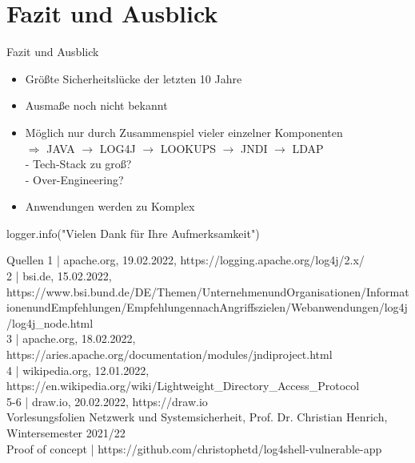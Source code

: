 \documentclass{beamer}
\begin{document}
\section{Fazit und Ausblick}
\begin{frame}{Fazit und Ausblick}
 \begin{itemize}
  \item Größte Sicherheitslücke der letzten 10 Jahre
  \item Ausmaße noch nicht bekannt
  \item Möglich nur durch Zusammenspiel vieler einzelner Komponenten\\
  $\Rightarrow$ JAVA $\rightarrow$ LOG4J $\rightarrow$ LOOKUPS $\rightarrow$ JNDI $\rightarrow$ LDAP\\
  - Tech-Stack zu groß?\\
  - Over-Engineering?
  \item  Anwendungen werden zu Komplex
  
 \end{itemize}
 \begin{center}
   logger.info("Vielen Dank für Ihre Aufmerksamkeit")
 \end{center}

\end{frame}
\begin{frame}{Quellen}
1 | apache.org, 19.02.2022, https://logging.apache.org/log4j/2.x/ \\
2 | bsi.de, 15.02.2022, https://www.bsi.bund.de/DE/Themen/Unternehmen\-und\-Organisationen/Informationen\-und\-Empfehlungen/Empfehlungen\-nach\-Angriffszielen/Webanwendungen/log4j/log4j\_node.html \\
3 | apache.org, 18.02.2022, https://aries.apache.org/documentation/modules/jndiproject.html\\
4 | wikipedia.org, 12.01.2022, https://en.wikipedia.org/wiki/Lightweight\_Directory\_Access\_Protocol\\
5-6 | draw.io, 20.02.2022, https://draw.io\\ 
Vorlesungsfolien Netzwerk und Systemsicherheit, Prof. Dr. Christian Henrich, Wintersemester 2021/22\\
Proof of concept | https://github.com/christophetd/log4shell-vulnerable-app
\end{frame}
\end{document}
